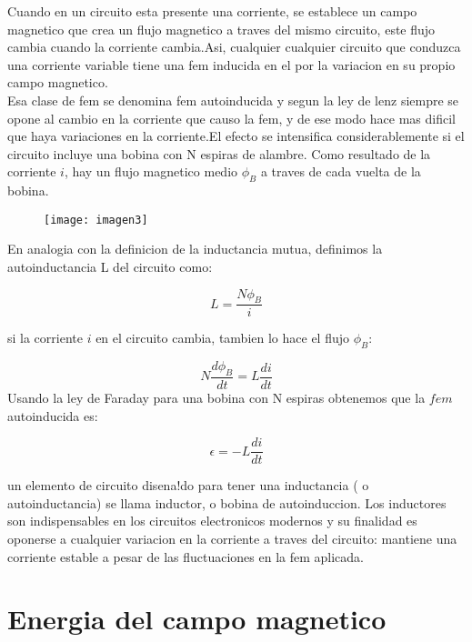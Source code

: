 \documentclass[13pt,twoside]{article}
\begin{document}
Cuando en un circuito esta presente una corriente, se establece un campo magnetico que crea un flujo magnetico a traves del mismo circuito, este flujo cambia cuando la corriente cambia.Asi, cualquier cualquier circuito que conduzca una corriente variable tiene una fem inducida en el por la variacion en su propio campo magnetico.\\

Esa clase de fem se denomina fem autoinducida y segun la ley de lenz siempre se opone al cambio en la corriente que causo la fem, y de ese modo hace mas dificil que haya variaciones en la corriente.El efecto se intensifica considerablemente si el circuito incluye una bobina con N espiras de alambre. Como resultado de la corriente $i$, hay un flujo magnetico medio $\phi_{B}$ a traves de cada vuelta de la bobina.

\begin{figure}[htb]
\centering
   \texttt{[image: imagen3]}
  \caption{}
  \label{} 
\end{figure}

En analogia con la definicion de la inductancia mutua, definimos la autoinductancia L del circuito como:

\begin{equation}
\displaystyle L=\frac{N\phi_{B}}{i}
\end {equation}

si la corriente $i$ en el circuito cambia, tambien lo hace el flujo $\phi_{B}$:
	
\begin{equation}
\displaystyle N\frac{d\phi_{B}}{dt}=L\frac{di}{dt}
\end{equation}
Usando la ley de Faraday para una bobina con N espiras obtenemos que la $fem$ autoinducida es:

\begin{equation}
\epsilon=-L\frac{di}{dt}
\end{equation}

un elemento de circuito disena!do para tener una inductancia ( o autoinductancia) se llama inductor, o bobina de autoinduccion. Los inductores son indispensables en los circuitos electronicos modernos y su finalidad es oponerse a cualquier variacion en la corriente a traves del circuito: mantiene una corriente estable a pesar de las fluctuaciones en la fem aplicada.

\section{ Energia del campo magnetico}
\end{document}
